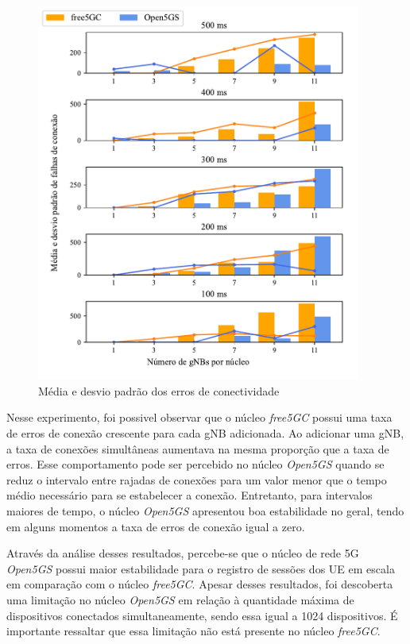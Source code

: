 \begin{figure}[H]
    \centering
    \includegraphics[width=0.95\textwidth]{TG2/Chapters/DataAnalysis/Figures/EXP1-CONN_ERR-12C-8GB.pdf}
    \caption{Média e desvio padrão dos erros de conectividade}
    \label{fig:exp1_conn_err}
\end{figure}


Nesse experimento, foi possivel observar que o núcleo \textit{free5GC} possui uma taxa de erros de conexão crescente para cada gNB adicionada. Ao adicionar uma gNB, a taxa de conexões simultâneas aumentava na mesma proporção que a taxa de erros.
Esse comportamento pode ser percebido no núcleo \textit{Open5GS} quando se reduz o intervalo entre rajadas de conexões para um valor menor que o tempo médio necessário para se estabelecer a conexão.
Entretanto, para intervalos maiores de tempo, o núcleo \textit{Open5GS} apresentou boa estabilidade no geral, tendo em alguns momentos a taxa de erros de conexão igual a zero.

Através da análise desses resultados, percebe-se que o núcleo de rede 5G \textit{Open5GS} possui maior estabilidade para o registro de sessões dos UE em escala em comparação com o núcleo \textit{free5GC}.
Apesar desses resultados, foi descoberta uma limitação no núcleo \textit{Open5GS} em relação à quantidade máxima de dispositivos conectados simultaneamente, sendo essa igual a 1024 dispositivos.
É importante ressaltar que essa limitação não está presente no núcleo \textit{free5GC}.



